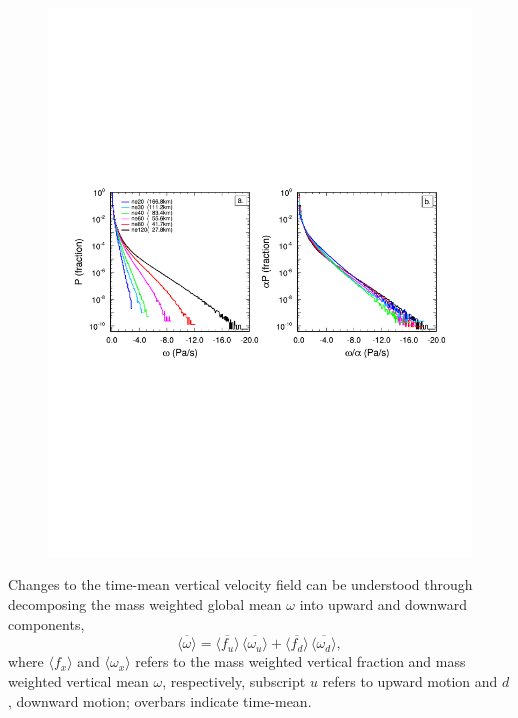 \begin{figure}[t]
\begin{center}
\noindent\includegraphics[width=33pc,angle=0]{chapter6/temp_2pdf.pdf}\\
\end{center}
\caption{}
\label{fig:2pdf}
\end{figure}

Changes to the time-mean vertical velocity field can be understood through decomposing the mass weighted global mean $\omega$ into upward and downward components,
\begin{equation}
\overline{\langle \omega \rangle} = \overline{\langle f_{u} \rangle} \, \overline{\langle \omega_{u} \rangle} + \overline{\langle f_{d} \rangle} \, \overline{\langle \omega_{d} \rangle}, \label{eq:eq6-2}
\end{equation}
where $\langle f_x \rangle$ and $\langle \omega_x \rangle$ refers to the mass weighted vertical fraction and mass weighted vertical mean $\omega$, respectively, subscript $u$ refers to upward motion and $d$, downward motion; overbars indicate time-mean.

